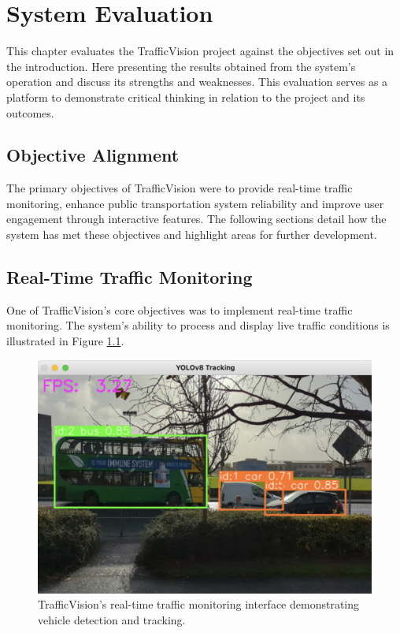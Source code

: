\chapter{System Evaluation}
This chapter evaluates the TrafficVision project against the objectives set out in the introduction. Here presenting the results obtained from the system's operation and discuss its strengths and weaknesses. This evaluation serves as a platform to demonstrate critical thinking in relation to the project and its outcomes.

\section{Objective Alignment}
The primary objectives of TrafficVision were to provide real-time traffic monitoring, enhance public transportation system reliability and improve user engagement through interactive features. The following sections detail how the system has met these objectives and highlight areas for further development.

\section{Real-Time Traffic Monitoring}
One of TrafficVision's core objectives was to implement real-time traffic monitoring. The system's ability to process and display live traffic conditions is illustrated in Figure \ref{fig:videoProcessing}.

\begin{figure}[H]
    \centering
    \includegraphics[width=1\linewidth]{images/videoProcessing.png}
    \caption{TrafficVision's real-time traffic monitoring interface demonstrating vehicle detection and tracking.}
    \label{fig:videoProcessing}
\end{figure}


